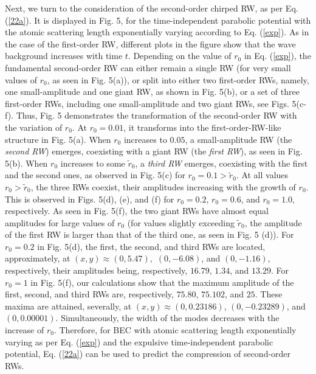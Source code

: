 \documentclass[preprintnumbers]{revtex4}
\begin{document}
Next, we turn to the consideration of the second-order chirped RW, as per
Eq. (\ref{22a}). It is displayed in Fig. 5, for the time-independent
parabolic potential with the atomic scattering length exponentially varying
according to Eq. (\ref{exp}). As in the case of the first-order RW,
different plots in the figure show that the wave background increases with
time $t$. Depending on the value of $r_{0}$ in Eq. (\ref{exp}), the
fundamental second-order RW can either remain a single RW (for very small
values of $r_{0}$, as seen in Fig. 5(a)), or split into either two
first-order RWs, namely, one small-amplitude and one giant RW, as shown in
Fig. 5(b), or a set of three first-order RWs, including one small-amplitude
and two giant RWs, see Figs. 5(c-f). Thus, Fig. 5 demonstrates the
transformation of the second-order RW with the variation of $r_{0}$. At $%
r_{0}=0.01$, it transforms into the first-order-RW-like structure in Fig.
5(a). When $r_{0}$ increases to $0.05$, a small-amplitude RW (the \textit{%
second RW}) emerges, coexisting with a giant RW (the \textit{first RW}), as
seen in Fig. 5(b). When $r_{0}$ increases to some $\widetilde{r}_{0}$, a
\textit{third RW} emerges, coexisting with the first and the second ones, as
observed in Fig. 5(c) for $r_{0}=0.1>\widetilde{r}_{0}.$ At all values $%
r_{0}>\widetilde{r}_{0}$, the three RWs coexist, their amplitudes increasing
with the growth of $r_{0}$. This is observed in Figs. 5(d), (e), and (f) for
$r_{0}=0.2$, $r_{0}=0.6$, and $r_{0}=1.0$, respectively. As seen in Fig.
5(f), the two giant RWs have almost equal amplitudes for large values of $%
r_{0}$ (for values slightly exceeding $\widetilde{r}_{0}$, the amplitude of
the first RW is larger than that of the third one, as seen in Fig. 5 (d)).
For $r_{0}=0.2$ in Fig. 5(d), the first, the second, and third RWs are
located, approximately, at $\left( x,y\right) \approx \left( 0,5.47\right) ,$
$\left( 0,-6.08\right) $, and $\left( 0,-1.16\right) $, respectively, their
amplitudes being, respectively, $16.79$, $1.34$, and $13.29$. For $r_{0}=1$
in Fig. 5(f), our calculations show that the maximum amplitude of the first,
second, and third RWs are, respectively, $75.80$, $75.102$, and $25$. These
maxima are attained, severally, at $\left( x,y\right) \approx \left(
0,0.23186\right) $, $\left( 0,-0.23289\right) $, and $\left(
0,0.00001\right) $. Simultaneously, the width of the modes decreases with
the increase of $r_{0}$. Therefore, for BEC with atomic scattering length
exponentially varying as per Eq. (\ref{exp}) and the expulsive
time-independent parabolic potential, Eq. (\ref{22a}) can be used to predict
the compression of second-order RWs.
\end{document}
